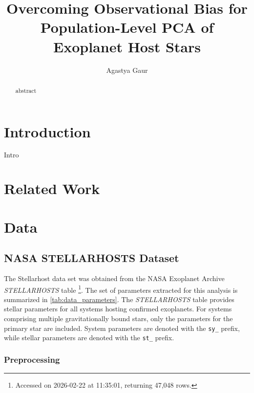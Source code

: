 \documentclass[preprint,longauthor,twocolumn]{aastex631}
\begin{document}
\title{Overcoming Observational Bias for Population-Level PCA of Exoplanet Host Stars}
\author{Agastya Gaur}

\begin{abstract}
  abstract
\end{abstract}

\tableofcontents

\section{Introduction}
Intro

\section{Related Work}

\section{Data}

\subsection{NASA STELLARHOSTS Dataset}

The Stellarhost data set was obtained from the NASA Exoplanet Archive \textit{STELLARHOSTS} table \citep{nasaexoplanetarchivePlanetarySystemsTable2026}\footnote{Accessed on 2026-02-22 at 11:35:01, returning 47,048 rows.}. The set of parameters extracted for this analysis is summarized in \autoref{tab:data_parameters}. The \textit{STELLARHOSTS} table provides stellar parameters for all systems hosting confirmed exoplanets. For systems comprising multiple gravitationally bound stars, only the parameters for the primary star are included. System parameters are denoted with the \verb|sy_| prefix, while stellar parameters are denoted with the \verb|st_| prefix.


\subsubsection{Preprocessing}
\end{document}
